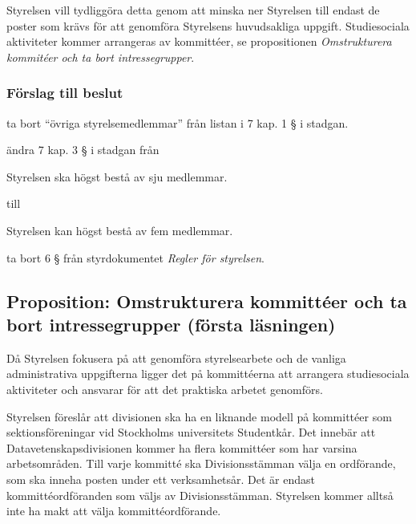 \documentclass[protokoll]{dvd}
\begin{document}
Styrelsen vill tydliggöra detta genom att minska ner Styrelsen till endast de poster som krävs för att genomföra Styrelsens huvudsakliga uppgift.
Studiesociala aktiviteter kommer arrangeras av kommittéer, se propositionen \textit{Omstrukturera kommitéer och ta bort intressegrupper}.

\subsubsection*{Förslag till beslut}

\begin{attsatser}
	\item ta bort ``övriga styrelsemedlemmar'' från listan i 7 kap. 1 § i stadgan.
	\item ändra 7 kap. 3 § i stadgan från

	\begin{displayquote}
		Styrelsen ska högst bestå av sju medlemmar.
	\end{displayquote}

	till

	\begin{displayquote}
		Styrelsen kan högst bestå av fem medlemmar.
	\end{displayquote}

	\item ta bort 6 § från styrdokumentet \emph{Regler för styrelsen}.
\end{attsatser}

\newpage
\subsection{Proposition: Omstrukturera kommittéer och ta bort intressegrupper (första läsningen)}

Då Styrelsen fokusera på att genomföra styrelsearbete och de vanliga administrativa uppgifterna ligger det på kommittéerna att arrangera studiesociala aktiviteter och ansvarar för att det praktiska arbetet genomförs.

Styrelsen föreslår att divisionen ska ha en liknande modell på kommittéer som sektionsföreningar vid Stockholms universitets Studentkår.
Det innebär att Datavetenskapsdivisionen kommer ha flera kommittéer som har varsina arbetsområden.
Till varje kommitté ska Divisionsstämman välja en ordförande, som ska inneha posten under ett verksamhetsår.
Det är endast kommittéordföranden som väljs av Divisionsstämman.
Styrelsen kommer alltså inte ha makt att välja kommittéordförande.
\end{document}
